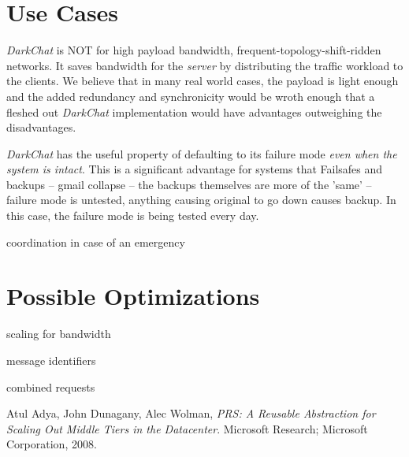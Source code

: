 \documentclass[11pt]{article}
\begin{document}
\section{Use Cases}

\emph{DarkChat} is NOT for high payload bandwidth, frequent-topology-shift-ridden networks. It saves bandwidth for the \emph{server} by distributing the traffic workload to the clients. We believe that in many real world cases, the payload is light enough and the added redundancy and synchronicity would be wroth enough that a fleshed out \emph{DarkChat} implementation would have advantages outweighing the disadvantages.

\emph{DarkChat} has the useful property of defaulting to its failure mode \emph{even when the system is intact}. This is a significant advantage for systems that
Failsafes and backups -- gmail collapse -- the backups themselves are more of the 'same' -- failure mode is untested, anything causing original to go down causes backup.
In this case, the failure mode is being tested every day.

coordination in case of an emergency

\section{Possible Optimizations}
scaling for bandwidth
   
message identifiers
   
combined requests

   
\begin{thebibliography}{1}

    Atul Adya, John Dunagany, Alec Wolman,
    \emph{PRS: A Reusable Abstraction for Scaling Out Middle Tiers in the Datacenter}.
    Microsoft Research; Microsoft Corporation,
    2008.
\end{thebibliography}
\end{document}
